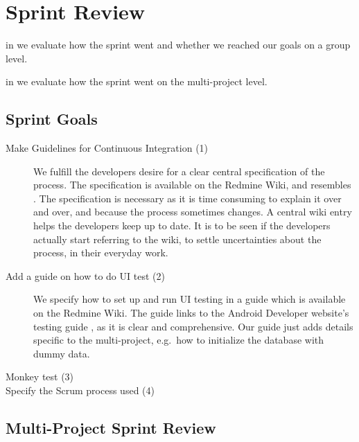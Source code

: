 \chapter{Sprint Review}\label{chap:sprint3_end}

\begin{chapterorganization}
  \item in  we evaluate how the sprint went and whether we reached our goals on a group level.
  \item in  we evaluate how the sprint went on the multi-project level.
\end{chapterorganization}

\section{Sprint Goals}\label{sec:s3_goals}
\begin{description}
    \item[Make Guidelines for Continuous Integration (1)] We fulfill the developers desire for a clear central specification of the process. The specification is available on the Redmine Wiki, and resembles . The specification is necessary as it is time consuming to explain it over and over, and because the process sometimes changes. A central wiki entry helps the developers keep up to date. It is to be seen if the developers actually start referring to the wiki, to settle uncertainties about the process, in their everyday work. 
    \item[Add a guide on how to do UI test (2)] We specify how to set up and run UI testing in a guide which is available on the Redmine Wiki. The guide links to the Android Developer website's testing guide \parencite{AndroidUnit}, as it is clear and comprehensive. Our guide just adds details specific to the multi-project, e.g.\ how to initialize the database with dummy data.  
    \item[Monkey test (3)] 
    \item[Specify the Scrum process used (4)]
\end{description}

\section{Multi-Project Sprint Review}\label{sec:s3_multiprj_review}
\dummy